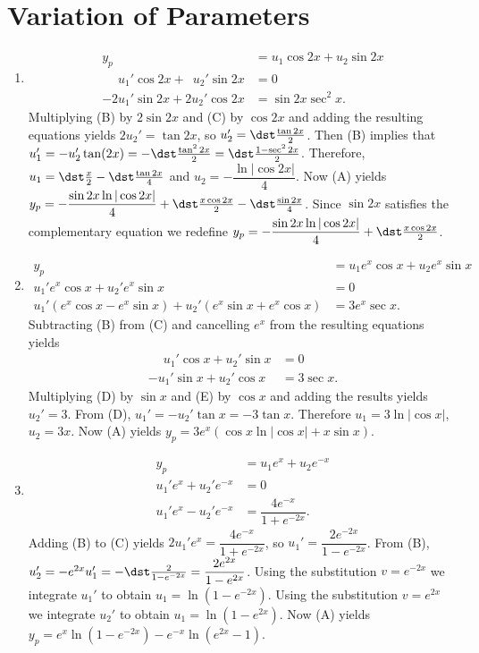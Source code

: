 \documentclass[openany]{book}
\newenvironment{sectionSolutions}{
 \begin{enumerate}[item-label={\thesection.\arabic{enumi}.}]
}{
 \end{enumerate}
}
\begin{document}
\section{Variation of Parameters}

\begin{sectionSolutions}
\item
\begin{align*}
y_p&=u_1\cos2x+u_2\sin2x \tag{A}\\
\phantom{-2}u_1'\cos2x+\phantom{2}u_2'\sin2x&=0\tag{B}\\
-2u_1'\sin2x+2u_2'\cos 2x&=\sin2x\sec^2x.\tag{C}
\end{align*}
Multiplying (B) by $2\sin2x$ and (C)
by $\cos2x$ and adding the resulting equations yields $2u_2'=\tan2x$,
so $u_2'=\dst\frac{\tan2x}{2}$. Then (B) implies that
$u_1'=-u_2'\tan(2x)=-\dst\frac{\tan^22x}{2}=\dst\frac{1-\sec^22x}{2}$.
Therefore,$u_1=\dst\frac{x}{2}-\dst\frac{\tan2x}{4}$ and
$u_2=-\dfrac{\ln|\cos2x|}{4}$. Now (A) yields $y_p=-\dfrac{\sin
2x\ln|\cos 2x|}{4} +\dst\frac{x\cos 2x}{2}-\dst\frac{\sin2x}{4}$. Since
$\sin2x$ satisfies the complementary equation we redefine
$y_p=-\dfrac{\sin 2x\ln|\cos 2x|}{4} +\dst\frac{x\cos 2x}{2}$.


\item
\begin{align*}
y_p&=u_1e^x\cos x+u_2e^x\sin x\tag{A}\\
u_1'e^x\cos x+u_2'e^x\sin x&=0\tag{B} \\
u_1'(e^x\cos x-e^x\sin x)+u_2'(e^x\sin x+e^x\cos x)&=3e^x\sec x. \tag{C}
\end{align*}
Subtracting (B)  from (C) and
cancelling  $e^x$ from the resulting equations yields
\begin{align*}
\phantom{-}u_1'\cos x+u_2'\sin x&=0\tag{D}\\
-u_1'\sin x+u_2'\cos x&=3\sec x.\tag{E}
\end{align*}
 Multiplying (D) by $\sin x$ and
 (E) by $\cos x$
and adding the results yields $u_2'=3$. From (D),
$u_1'=-u_2'\tan x=-3\tan x$. Therefore $u_1=3\ln|\cos x|$, $u_2=3x$.
Now (A) yields $y_p=3e^x(\cos x \ln |\cos x|+x\sin x)$.


\item
\begin{align*}
y_p&=u_1e^x+u_2e^{-x}\tag{A}\\
u_1'e^x+u_2'e^{-x}&=0\tag{B}\\
u_1'e^x-u_2'e^{-x}&=\dfrac{4e^{-x}}{ 1+e^{-2x}}.\tag{C}
\end{align*}
Adding (B) to (C) yields
$2u_1'e^x=\dfrac{4e^{-x}}{ 1+e^{-2x}}$, so $u_1'=\dfrac{2e^{-2x}}{
1-e^{-2x}}$. From (B),
$u_2'=-e^{2x}u_1'=-\dst\frac{2}{1-e^{-2x}}=\dfrac{2e^{2x}}{1-e^{2x}}$.
Using the substitution $v=e^{-2x}$ we integrate $u_1'$ to obtain
$u_1=\ln(1-e^{-2x})$. Using the substitution $v=e^{2x}$ we integrate
$u_2'$ to obtain $u_1=\ln(1-e^{2x})$. Now (A) yields
$y_p=e^x\ln(1-e^{-2x})-e^{-x}\ln(e^{2x}-1)$.



\end{sectionSolutions}
\end{document}
